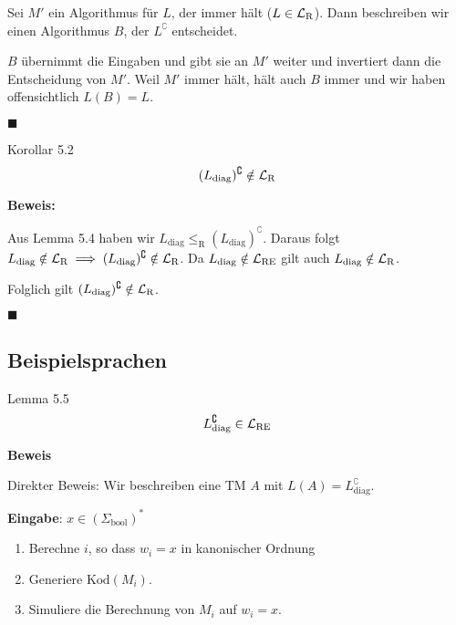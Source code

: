             Sei $M'$ ein Algorithmus für $L$, der immer hält ($L \in \mathcal{L}_\text{R}$). Dann beschreiben wir einen Algorithmus $B$, der $L^\complement$ entscheidet. 
            
            $B$ übernimmt die Eingaben und gibt sie an $M'$ weiter und invertiert dann die Entscheidung von $M'$. Weil $M'$ immer hält, hält auch $B$ immer und wir haben offensichtlich $L(B) = L$.
        
            \hspace*{0pt}\hfill$\blacksquare$
        
            
            \begin{subbox}{Korollar 5.2}
                $$(L_\text{diag})^\complement \notin \mathcal{L}_\text{R}$$
            \end{subbox}
            
            \textbf{Beweis:} 
            
            Aus Lemma 5.4 haben wir $L_\text{diag} \leq_\text{R} (L_\text{diag})^\complement$. Daraus folgt $L_\text{diag} \notin \mathcal{L}_\text{R} \implies (L_\text{diag})^\complement \notin \mathcal{L}_\text{R}$.
            Da $L_\text{diag} \notin \mathcal{L}_\text{RE}$ gilt auch $L_\text{diag} \notin \mathcal{L}_\text{R}$. 
            
            Folglich gilt $(L_\text{diag})^\complement \notin \mathcal{L}_\text{R}$.
        
            \hspace*{0pt}\hfill$\blacksquare$
        
        
            
            \subsection{Beispielsprachen}
          

            \begin{mainbox}{Lemma 5.5}
                $$L_{\text{diag}}^{\complement} \in \mathcal{L}_\text{RE}$$
            \end{mainbox}
            \textbf{Beweis}
                
            
                Direkter Beweis: Wir beschreiben eine TM $A$ mit $L(A) = L_{\text{diag}}^\complement$.
                
                \textbf{Eingabe}: $x \in (\Sigma_{\text{bool}})^*$
                
                \begin{enumerate}[label=(\roman*)]
                    \item Berechne $i$, so dass $w_i = x$ in kanonischer Ordnung
                    \item Generiere $\text{Kod}(M_i)$.
                    \item Simuliere die Berechnung von $M_i$ auf $w_i = x$. 
                \end{enumerate}
               
